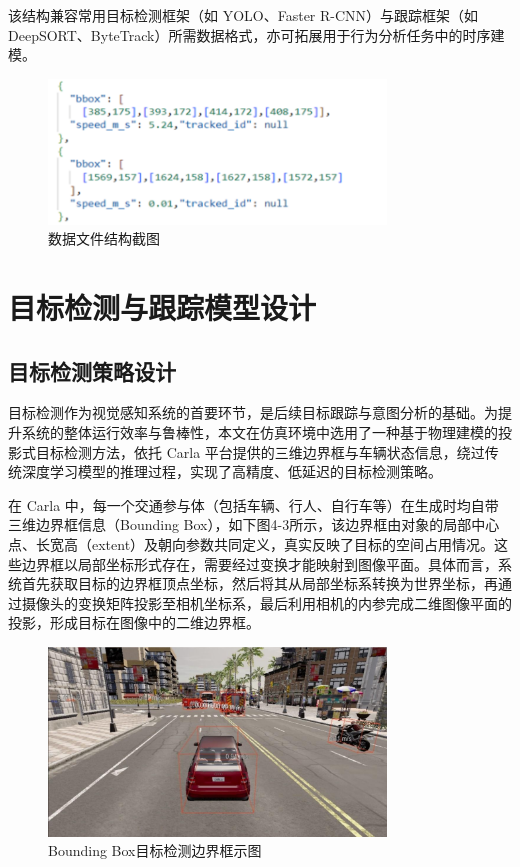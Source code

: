 该结构兼容常用目标检测框架（如 YOLO、Faster R-CNN）与跟踪框架（如 DeepSORT、ByteTrack）所需数据格式，亦可拓展用于行为分析任务中的时序建模。

\begin{figure}[H]
    \centering
    \includegraphics[width=0.8\textwidth]{images/图8 数据文件结构截图.pdf}  %
    \caption{数据文件结构截图}
    \label{fig:example_image}  %
\end{figure}

\section{目标检测与跟踪模型设计}

\subsection{目标检测策略设计}

目标检测作为视觉感知系统的首要环节，是后续目标跟踪与意图分析的基础。为提升系统的整体运行效率与鲁棒性，本文在仿真环境中选用了一种基于物理建模的投影式目标检测方法，依托 Carla 平台提供的三维边界框与车辆状态信息，绕过传统深度学习模型的推理过程，实现了高精度、低延迟的目标检测策略。

在 Carla 中，每一个交通参与体（包括车辆、行人、自行车等）在生成时均自带三维边界框信息（Bounding Box），如下图4-3所示，该边界框由对象的局部中心点、长宽高（extent）及朝向参数共同定义，真实反映了目标的空间占用情况。这些边界框以局部坐标形式存在，需要经过变换才能映射到图像平面。具体而言，系统首先获取目标的边界框顶点坐标，然后将其从局部坐标系转换为世界坐标，再通过摄像头的变换矩阵投影至相机坐标系，最后利用相机的内参完成二维图像平面的投影，形成目标在图像中的二维边界框。

\begin{figure}[H]
    \centering
    \includegraphics[width=0.8\textwidth]{images/图9 Bounding Box目标检测边界框示图.pdf}  %
    \caption{Bounding Box目标检测边界框示图}
    \label{fig:example_image}  %
\end{figure}

